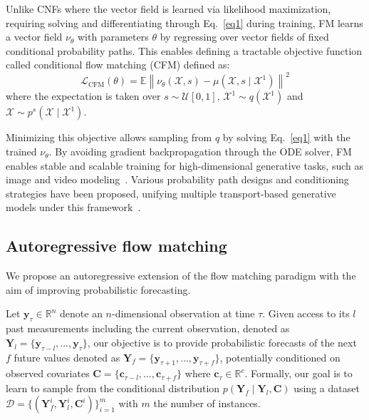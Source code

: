 \documentclass[a4paper,10pt,twocolumn,preprint,3p]{elsarticle}
\begin{document}
Unlike CNFs where the vector field is learned via likelihood maximization, requiring solving and differentiating through Eq.~\eqref{eq1} during training, FM learns a vector field $\nu_\theta$ with parameters $\theta$ by regressing over vector fields of fixed conditional probability paths. 
This enables defining a tractable objective function called conditional flow matching (CFM) defined as:
\begin{equation}\label{eq:cfm}
\mathcal{L}_{\text{CFM}}(\theta) = \mathbb{E} \left\| \nu_{\theta}(\mathcal{X}, s) - \mu(\mathcal{X}, s\mid \mathcal{X}^1)\right\|^2
\end{equation}
where the expectation is taken over $s \sim \mathcal{U}[0, 1]$, $ \mathcal{X}^1 \sim q(\mathcal{X}^1)$ and $\mathcal{X} \sim p^s(\mathcal{X} \mid \mathcal{X}^1)$.

Minimizing this objective allows sampling from $q$ by solving Eq.~\eqref{eq1} with the trained $\nu_\theta$. By avoiding gradient backpropagation through the ODE solver, FM enables stable and scalable training for high-dimensional generative tasks, such as image and video modeling~\citep{esser2024scaling, polyak2024movie}. Various probability path designs and conditioning strategies have been proposed, unifying multiple transport-based generative models under this framework~\citep{liu2022flow, albergo2023stochastic, tong2023improving}.

\subsection{Autoregressive flow matching}
\label{sec:AFM}

We propose an autoregressive extension of the flow matching paradigm with the aim of improving probabilistic forecasting. 

Let $\mathbf{y}_\tau \in \mathbb{R}^n$ denote an $n$-dimensional observation at time $\tau$. Given access to its $l$ past measurements including the current observation, denoted as $\mathbf{Y}_l = \{\mathbf{y}_{\tau - l}, \ldots, \mathbf{y}_{\tau}\}$, our objective is to provide probabilistic forecasts of the next $f$ future values denoted as $\mathbf{Y}_f = \{\mathbf{y}_{\tau+1}, \ldots, \mathbf{y}_{\tau+f}\}$, potentially conditioned on observed covariates $\mathbf{C} = \{\mathbf{c}_{\tau - l}, \ldots,\mathbf{c}_{\tau+f}\}$ where $\mathbf{c}_\tau \in \mathbb{R}^c$. Formally, our goal is to learn to sample from the conditional distribution $p(\mathbf{Y}_f \mid \mathbf{Y}_l, \mathbf{C})$ using a dataset $\mathcal{D}=\{(\mathbf{Y}^i_f, \mathbf{Y}^i_l, \mathbf{C}^i)\}_{i=1}^{m}$ with $m$ the number of instances.
\end{document}
